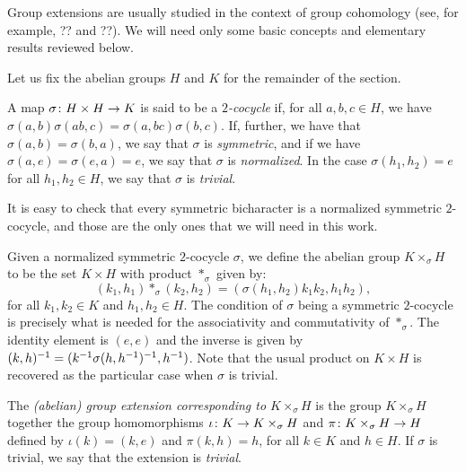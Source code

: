Group extensions are usually studied in the context of group cohomology (see, for example, ?? and ??).  
We will need only some basic concepts and elementary results reviewed below. 

Let us fix the abelian groups $H$ and $K$ for the remainder of the section.

\begin{defi}
    A map $\sigma\colon H\times H \to K$ is said to be a \emph{$2$-cocycle} if, for all $a,b,c \in H$, we have $\sigma(a,b) \sigma(ab, c) = \sigma(a, bc) \sigma(b,c)$. 
    If, further, we have that $\sigma(a,b) = \sigma(b,a)$, we say that $\sigma$ is \emph{symmetric}, and if we have $\sigma(a, e) = \sigma(e, a) = e$, we say that $\sigma$ is \emph{normalized}. 
    In the case $\sigma(h_1, h_2) = e$ for all $h_1, h_2 \in H$, we say that $\sigma$ is \emph{trivial}.
\end{defi}

It is easy to check that every symmetric bicharacter is a normalized symmetric $2$-cocycle, and those are the only ones that we will need in this work. 

Given a normalized symmetric $2$-cocycle $\sigma$, we define the abelian group $K \times_\sigma H$ to be the set $K\times H$ with product $*_\sigma$ given by:
\[
    (k_1, h_1)*_\sigma(k_2, h_2) = (\sigma(h_1, h_2) k_1 k_2, h_1 h_2),
\]
for all $k_1, k_2 \in K$ and $h_1, h_2 \in H$. 
The condition of $\sigma$ being a symmetric $2$-cocycle is precisely what is needed for the associativity and commutativity of $*_\sigma$. 
The identity element is $(e, e)$ and the inverse is given by $(k, h)^{-1} = (k^{-1} \sigma(h,h^{-1})^{-1}, h^{-1})$. 
Note that the usual product on $K\times H$ is recovered as the particular case when $\sigma$ is trivial.

\begin{defi}
    The \emph{(abelian) group extension corresponding to $K \times_\sigma H$} is the group $K \times_\sigma H$ together the group homomorphisms $\iota \colon K \to K \times_\sigma H$ and $\pi \colon K \times_\sigma H \to H$ defined by $\iota (k) = (k , e)$ and $\pi (k, h) = h$, for all $k\in K$ and $h\in H$. 
    If $\sigma$ is trivial, we say that the extension is \emph{trivial}.
\end{defi}

